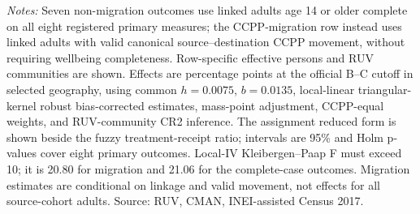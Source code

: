\parbox{0.97\linewidth}{\footnotesize \textit{Notes:} Seven non-migration outcomes use linked adults age 14 or older complete on all eight registered primary measures; the CCPP-migration row instead uses linked adults with valid canonical source--destination CCPP movement, without requiring wellbeing completeness. Row-specific effective persons and RUV communities are shown. Effects are percentage points at the official B--C cutoff in selected geography, using common \(h=0.0075\), \(b=0.0135\), local-linear triangular-kernel robust bias-corrected estimates, mass-point adjustment, CCPP-equal weights, and RUV-community CR2 inference. The assignment reduced form is shown beside the fuzzy treatment-receipt ratio; intervals are 95\% and Holm p-values cover eight primary outcomes. Local-IV Kleibergen--Paap F must exceed 10; it is 20.80 for migration and 21.06 for the complete-case outcomes. Migration estimates are conditional on linkage and valid movement, not effects for all source-cohort adults. Source: RUV, CMAN, INEI-assisted Census 2017.}
\par{}\par\endgroup
